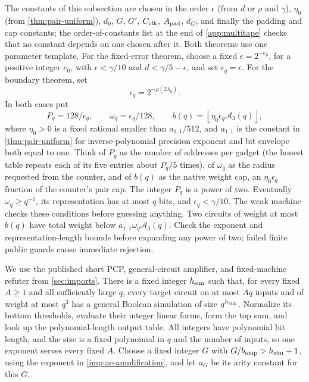 \documentclass[11pt,letterpaper]{article}
\theoremstyle{definition}
\theoremstyle{remark}
\begin{document}
The constants of this subsection are chosen in the order $\epsilon$ (from
$d$ or $\rho$ and $\gamma$), $\eta_0$ (from \cref{thm:pair-uniform}), $d_0$,
$G$, $G'$, $C_{\rm clk}$, $A_{\rm pad}$, $d_G$, and finally the padding and
cap constants; the order-of-constants list at the end of
\cref{app:multitape} checks that no constant depends on one chosen after
it. Both theorems use one parameter template. For the fixed-error
theorem, choose a fixed $\epsilon=2^{-e_0}$, for a positive integer $e_0$, with
$\epsilon<\gamma/10$ and $d<\gamma/5-\epsilon$, and set
$\epsilon_q=\epsilon$. For the boundary theorem, set
\[
 \epsilon_q=2^{-\rho(2\lambda_q)}.
\]
In both cases put
\begin{equation}\label{eq:gadget-parameters}
 P_q=128/\epsilon_q,\qquad
 \omega_q=\epsilon_q/128,\qquad
 b(q)=\left\lfloor\eta_0\epsilon_q\mathcal A_3(q)\right\rfloor,
\end{equation}
where $\eta_0>0$ is a fixed rational smaller than $a_{1,1}/512$,
and $a_{1,1}$ is the constant in \cref{thm:pair-uniform} for
inverse-polynomial precision exponent and bit envelope both equal to
one. Think of $P_q$ as the number of addresses per gadget (the honest
table repeats each of its five entries about $P_q/5$ times), of
$\omega_q$ as the radius requested from the counter, and of $b(q)$ as the
native weight cap, an $\eta_0\epsilon_q$ fraction of the counter's pair
cap. The integer $P_q$ is a power of two. Eventually
$\omega_q\ge q^{-1}$, its representation has at most $q$ bits,
and $\epsilon_q<\gamma/10$. The weak machine checks these conditions
before guessing anything. Two circuits of weight at most $b(q)$
have total weight below $a_{1,1}\omega_q\mathcal A_3(q)$.
Check the exponent and representation-length bounds before expanding
any power of two; failed finite public guards cause immediate rejection.

We use the published short PCP, general-circuit amplifier, and
fixed-machine refuter from \cref{sec:imports}. There is a fixed
integer $h_{\rm sim}$ such that, for every fixed $A\ge1$ and all
sufficiently large $q$, every target circuit on at most $Aq$ inputs and
of weight at most $q^3$ has a general Boolean simulation of size
$q^{h_{\rm sim}}$. Normalize its bottom thresholds, evaluate their integer
linear forms, form the top sum, and look up the polynomial-length output
table. All integers have polynomial bit length, and the size is a fixed
polynomial in $q$ and the number of inputs, so one exponent serves every
fixed $A$. Choose a fixed integer $G$ with $G/b_{\rm amp}>h_{\rm sim}+1$,
using the exponent in \cref{imp:ae-amplification}, and let $a_G$ be its
arity constant for this $G$.
\end{document}
